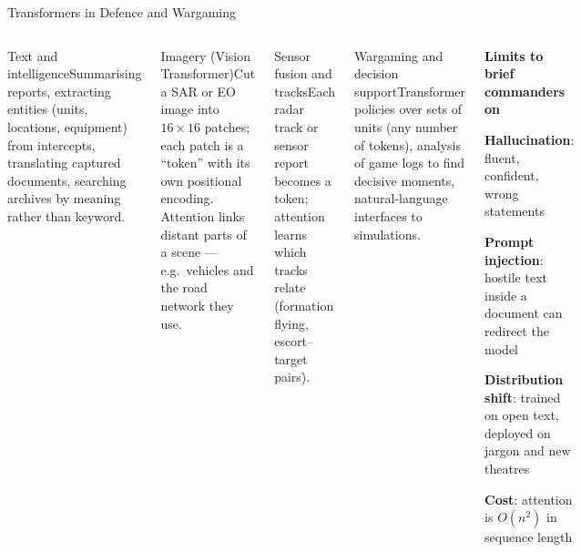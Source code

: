 \documentclass[aspectratio=169,10pt]{beamer}
\begin{document}
\begin{frame}{Transformers in Defence and Wargaming}
\begin{columns}[T]
\begin{cbox}{Text and intelligence}\scriptsize Summarising reports, extracting entities (units, locations, equipment) from intercepts, translating captured documents, searching archives by meaning rather than keyword.\end{cbox}
\begin{cbox}{Imagery (Vision Transformer)}\scriptsize Cut a SAR or EO image into $16\times16$ patches; each patch is a ``token'' with its own positional encoding. Attention links distant parts of a scene --- e.g.\ vehicles and the road network they use.\end{cbox}
\begin{cbox}{Sensor fusion and tracks}\scriptsize Each radar track or sensor report becomes a token; attention learns which tracks relate (formation flying, escort--target pairs).\end{cbox}
\begin{cbox}{Wargaming and decision support}\scriptsize Transformer policies over sets of units (any number of tokens), analysis of game logs to find decisive moments, natural-language interfaces to simulations.\end{cbox}
\begin{wbox}\scriptsize\textbf{Limits to brief commanders on}
\begin{tl}
\item \textbf{Hallucination}: fluent, confident, wrong statements
\item \textbf{Prompt injection}: hostile text inside a document can redirect the model
\item \textbf{Distribution shift}: trained on open text, deployed on jargon and new theatres
\item \textbf{Cost}: attention is $O(n^2)$ in sequence length
\end{tl}\end{wbox}
\end{columns}
\end{frame}
\end{document}
